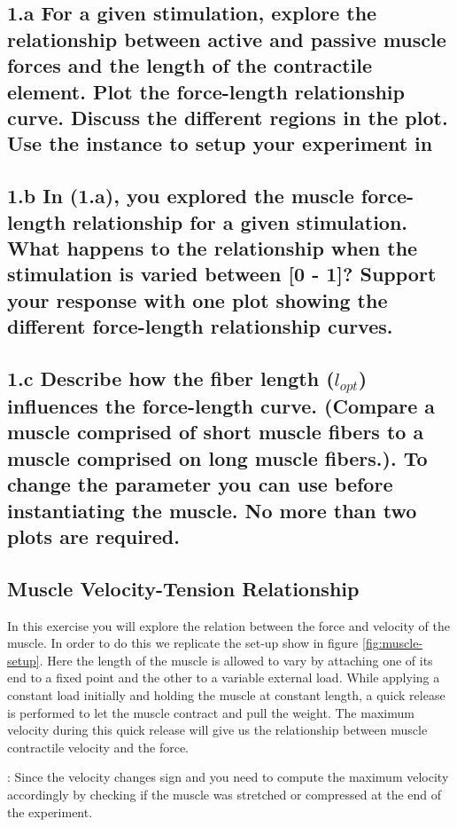 \documentclass{cmc}
\begin{document}
\subsection*{1.a For a given stimulation, explore the relationship
  between active and passive muscle forces and the length of the
  contractile element.  Plot the force-length relationship curve.
  Discuss the different regions in the plot. Use the
   instance
  to setup your experiment in }

\subsection*{1.b In (1.a), you explored the muscle force-length
  relationship for a given stimulation. What happens to the
  relationship when the stimulation is varied between [0 - 1]? Support
  your response with one plot showing the different force-length
  relationship curves.}


\subsection*{1.c Describe how the fiber length ($l_{opt}$) influences
  the force-length curve.  (Compare a muscle comprised of short muscle
  fibers to a muscle comprised on long muscle fibers.). To change the
  parameter you can use
   before
  instantiating the muscle. No more than two plots are required. }


\subsection*{Muscle Velocity-Tension Relationship}
In this exercise you will explore the relation between the force and
velocity of the muscle. In order to do this we replicate the set-up
show in figure \ref{fig:muscle-setup}. Here the length of the muscle
is allowed to vary by attaching one of its end to a fixed point and
the other to a variable external load. While applying a constant load
initially and holding the muscle at constant length, a quick release
is performed to let the muscle contract and pull the weight. The
maximum velocity during this quick release will give us the
relationship between muscle contractile velocity and the force.


 : Since the velocity changes sign and you need to compute the maximum
velocity accordingly by checking if the muscle was stretched or compressed
at the end of the experiment.
\end{document}
